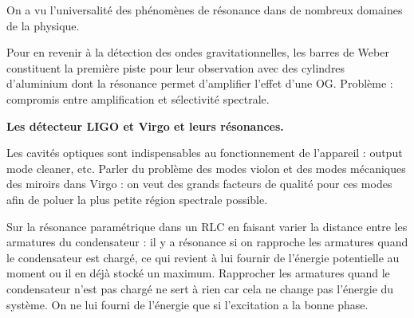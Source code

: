 On a vu l'universalité des phénomènes de résonance dans de nombreux domaines de la physique.

Pour en revenir à la détection des ondes gravitationnelles, les barres de Weber constituent la première piste pour leur observation avec des cylindres d'aluminium dont la résonance permet d'amplifier l'effet d'une OG.
Problème : compromis entre amplification et sélectivité spectrale.
\begin{slide}
\textbf{Les détecteur LIGO et Virgo et leurs résonances.}
\end{slide}
Les cavités optiques sont indispensables au fonctionnement de l'appareil : output mode cleaner, etc.
Parler du problème des modes violon et des modes mécaniques des miroirs dans Virgo : on veut des grands facteurs de qualité pour ces modes afin de poluer la plus petite région spectrale possible.

\begin{funfact}
Sur la résonance paramétrique dans un RLC en faisant varier la distance entre les armatures du condensateur : il y a résonance si on rapproche les armatures quand le condensateur est chargé, ce qui revient à lui fournir de l'énergie potentielle au moment ou il en déjà stocké un maximum.
Rapprocher les armatures quand le condensateur n'est pas chargé ne sert à rien car cela ne change pas l'énergie du système.
On ne lui fourni de l'énergie que si l'excitation a la bonne phase.
\end{funfact}

\newpage